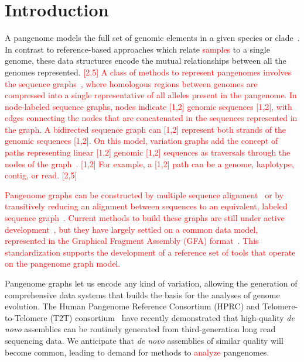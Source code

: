 \documentclass{bioinfo}
\newcommand{\REVIEWED}[1]{{\textcolor{Red}{#1}}}
\begin{document}
\section{Introduction}
A pangenome models the full set of genomic elements in a given species or clade~\REVIEWED{\citep{cpang2018,Eizenga_2020}}.
In contrast to reference-based approaches which relate \REVIEWED{samples} to a single genome, these data structures encode the mutual relationships between all the genomes represented.
\REVIEWED{[2,5] A class of methods to represent pangenomes involves the sequence graphs~\citep{Hein1989, Paten:2017}, where homologous regions between genomes are compressed into a single representative of all alleles present in the pangenome.
In node-labeled sequence graphs, nodes indicate \REVIEWED{[1,2] genomic sequences [1,2]}, with edges connecting the nodes that are concatenated in the sequences represented in the graph.
A bidirected sequence graph can \REVIEWED{[1,2] represent both strands of the genomic sequences [1,2]}.
On this model, variation graphs add the concept of paths representing linear \REVIEWED{[1,2] genomic [1,2]} sequences as traversals through the nodes of the graph~\citep{Garrison:2018}. \REVIEWED{[1,2] For example, a [1,2]} path can be a genome, haplotype, contig, or read. [2,5]}

\REVIEWED{Pangenome graphs can be constructed by multiple sequence alignment~\citep{Lee_2002,Grasso_2004} or by transitively reducing an alignment between sequences to an equivalent, labeled sequence graph~\citep{Kehr_2014,Garrison_2019_thesis}.
Current methods to build these graphs are still under active development~\citep{Li:2020,Armstrong:2020,pggb}, but they have largely settled on a common data model, represented in the Graphical Fragment Assembly (GFA) format~\citep{GFA}.
This standardization supports the development of a reference set of tools that operate on the pangenome graph model.}

Pangenome graphs let us encode any kind of variation, allowing the generation of comprehensive data systems that builds the basis for the analyses of genome evolution.
The Human Pangenome Reference Consortium (HPRC) and Telomere-to-Telomere (T2T) consortium~\citep{Miga:2020, Logsdon_2021, Nurk_2021} have recently demonstrated that high-quality \textit{de novo} assemblies can be routinely generated from third-generation long read sequencing data.
We anticipate that \textit{de novo} assemblies of similar quality will become common, leading to demand for methods to \REVIEWED{analyze} pangenomes.
\end{document}
